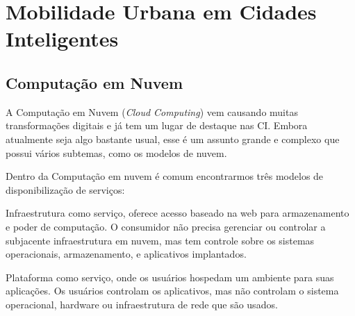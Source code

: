 %
%

\chapter{Mobilidade Urbana em Cidades Inteligentes}\label{chap:Mobilidade Urbana em Cidades Inteligentes} %

\section{Computação em Nuvem}
A Computação em Nuvem (\textit{Cloud Computing}) vem causando muitas transformações digitais e já tem um lugar de destaque nas CI. Embora atualmente seja algo bastante usual, esse é um assunto grande e complexo que possui vários subtemas, como os modelos de nuvem.

Dentro da Computação em nuvem é comum encontrarmos três modelos de disponibilização de serviços: 

Infraestrutura como serviço, oferece acesso baseado na web para armazenamento e poder de computação. O consumidor não precisa gerenciar ou controlar a subjacente infraestrutura em nuvem, mas tem controle sobre os sistemas operacionais, armazenamento, e aplicativos implantados.

Plataforma como serviço, onde os usuários hospedam um
ambiente para suas aplicações. Os usuários controlam os aplicativos, mas não controlam o sistema operacional, hardware ou infraestrutura de rede que são usados.


